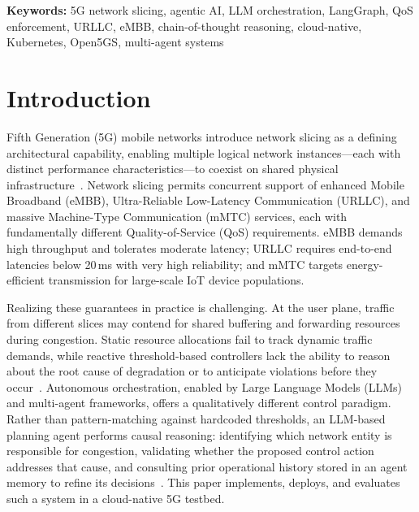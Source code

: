 \documentclass[12pt]{article}
\begin{document}
\medskip
\noindent\textbf{Keywords:} 5G network slicing, agentic AI, LLM orchestration, LangGraph, QoS enforcement, URLLC, eMBB, chain-of-thought reasoning, cloud-native, Kubernetes, Open5GS, multi-agent systems
\vspace{1em}

\section{Introduction}
\label{sec:introduction}

Fifth Generation (5G) mobile networks introduce network slicing as a
defining architectural capability, enabling multiple logical network
instances---each with distinct performance characteristics---to coexist
on shared physical infrastructure~\cite{tsai2021upf}. Network slicing
permits concurrent support of enhanced Mobile Broadband (eMBB),
Ultra-Reliable Low-Latency Communication (URLLC), and massive
Machine-Type Communication (mMTC) services, each with fundamentally
different Quality-of-Service (QoS) requirements. eMBB demands high
throughput and tolerates moderate latency; URLLC requires end-to-end
latencies below 20\,ms with very high reliability; and mMTC targets
energy-efficient transmission for large-scale IoT device populations.

Realizing these guarantees in practice is challenging. At the user plane,
traffic from different slices may contend for shared buffering and
forwarding resources during congestion. Static resource allocations fail
to track dynamic traffic demands, while reactive threshold-based
controllers lack the ability to reason about the root cause of degradation
or to anticipate violations before they occur~\cite{zhou2021predict}.
Autonomous orchestration, enabled by Large Language Models (LLMs) and
multi-agent frameworks, offers a qualitatively different control paradigm.
Rather than pattern-matching against hardcoded thresholds, an LLM-based
planning agent performs causal reasoning: identifying which network entity
is responsible for congestion, validating whether the proposed control
action addresses that cause, and consulting prior operational history
stored in an agent memory to refine its decisions~\cite{park2024llm,openai2023cot}.
This paper implements, deploys, and evaluates such a system in a
cloud-native 5G testbed.
\end{document}
